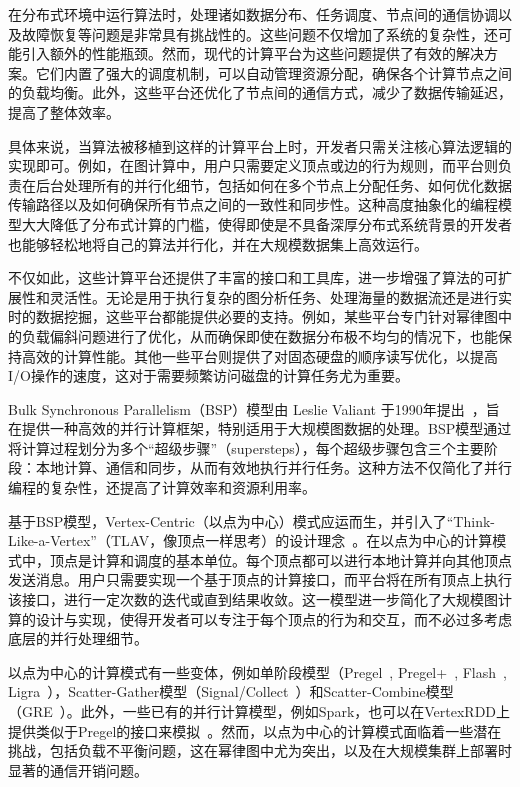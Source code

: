 在分布式环境中运行算法时，处理诸如数据分布、任务调度、节点间的通信协调以及故障恢复等问题是非常具有挑战性的。这些问题不仅增加了系统的复杂性，还可能引入额外的性能瓶颈。然而，现代的计算平台为这些问题提供了有效的解决方案。它们内置了强大的调度机制，可以自动管理资源分配，确保各个计算节点之间的负载均衡。此外，这些平台还优化了节点间的通信方式，减少了数据传输延迟，提高了整体效率。

具体来说，当算法被移植到这样的计算平台上时，开发者只需关注核心算法逻辑的实现即可。例如，在图计算中，用户只需要定义顶点或边的行为规则，而平台则负责在后台处理所有的并行化细节，包括如何在多个节点上分配任务、如何优化数据传输路径以及如何确保所有节点之间的一致性和同步性。这种高度抽象化的编程模型大大降低了分布式计算的门槛，使得即使是不具备深厚分布式系统背景的开发者也能够轻松地将自己的算法并行化，并在大规模数据集上高效运行。

不仅如此，这些计算平台还提供了丰富的接口和工具库，进一步增强了算法的可扩展性和灵活性。无论是用于执行复杂的图分析任务、处理海量的数据流还是进行实时的数据挖掘，这些平台都能提供必要的支持。例如，某些平台专门针对幂律图中的负载偏斜问题进行了优化，从而确保即使在数据分布极不均匀的情况下，也能保持高效的计算性能。其他一些平台则提供了对固态硬盘的顺序读写优化，以提高I/O操作的速度，这对于需要频繁访问磁盘的计算任务尤为重要。

Bulk Synchronous Parallelism（BSP）模型由 Leslie Valiant 于1990年提出~\cite{valiant1990bridging}，旨在提供一种高效的并行计算框架，特别适用于大规模图数据的处理。BSP模型通过将计算过程划分为多个“超级步骤”（supersteps），每个超级步骤包含三个主要阶段：本地计算、通信和同步，从而有效地执行并行任务。这种方法不仅简化了并行编程的复杂性，还提高了计算效率和资源利用率。

基于BSP模型，Vertex-Centric（以点为中心）模式应运而生，并引入了“Think-Like-a-Vertex”（TLAV，像顶点一样思考）的设计理念~\cite{mccune2015thinking}。在以点为中心的计算模式中，顶点是计算和调度的基本单位。每个顶点都可以进行本地计算并向其他顶点发送消息。用户只需要实现一个基于顶点的计算接口，而平台将在所有顶点上执行该接口，进行一定次数的迭代或直到结果收敛。这一模型进一步简化了大规模图计算的设计与实现，使得开发者可以专注于每个顶点的行为和交互，而不必过多考虑底层的并行处理细节。

以点为中心的计算模式有一些变体，例如单阶段模型（Pregel~\cite{malewicz2010pregel}, Pregel+~\cite{yan2015effective}, Flash~\cite{10184838}, Ligra~\cite{DBLP:conf/ppopp/ShunB13}），Scatter-Gather模型（Signal/Collect~\cite{stutz2010signal}）和Scatter-Combine模型（GRE~\cite{yan2014pregel}）。此外，一些已有的并行计算模型，例如Spark，也可以在VertexRDD上提供类似于Pregel的接口来模拟~\cite{gonzalez2014graphx}。然而，以点为中心的计算模式面临着一些潜在挑战，包括负载不平衡问题，这在幂律图中尤为突出，以及在大规模集群上部署时显著的通信开销问题。

